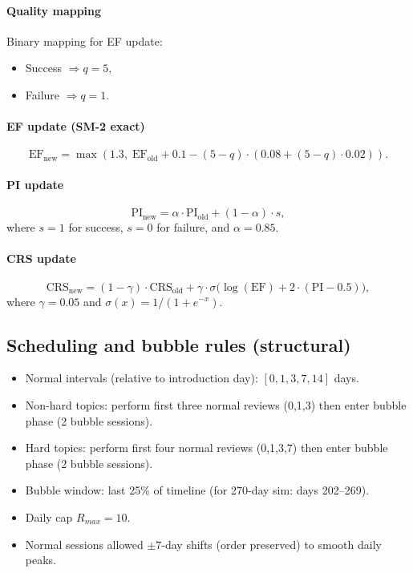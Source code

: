 \documentclass[12pt]{article}
\begin{document}
\paragraph{Quality mapping}
Binary mapping for EF update:
\begin{itemize}
  \item Success $\Rightarrow q = 5$,
  \item Failure $\Rightarrow q = 1$.
\end{itemize}

\paragraph{EF update (SM-2 exact)}
\begin{equation}
\text{EF}_{\text{new}} = \max\left(1.3,\; \text{EF}_{\text{old}} + 0.1 - (5 - q)\cdot\left(0.08 + (5 - q)\cdot 0.02\right)\right).
\end{equation}

\paragraph{PI update}
\begin{equation}
\text{PI}_{\text{new}} = \alpha\cdot\text{PI}_{\text{old}} + (1 - \alpha)\cdot s,
\end{equation}
where $s=1$ for success, $s=0$ for failure, and $\alpha = 0.85$.

\paragraph{CRS update}
\begin{equation}
\text{CRS}_{\text{new}} = (1 - \gamma)\cdot\text{CRS}_{\text{old}} + \gamma\cdot \sigma\big(\log(\text{EF}) + 2\cdot(\text{PI} - 0.5)\big),
\end{equation}
where $\gamma = 0.05$ and $\sigma(x) = 1/(1 + e^{-x})$.

\subsection*{Scheduling and bubble rules (structural)}
\begin{itemize}
  \item Normal intervals (relative to introduction day): $[0,1,3,7,14]$ days.
  \item Non-hard topics: perform first three normal reviews (0,1,3) then enter bubble phase (2 bubble sessions).
  \item Hard topics: perform first four normal reviews (0,1,3,7) then enter bubble phase (2 bubble sessions).
  \item Bubble window: last 25\% of timeline (for 270-day sim: days 202--269).
  \item Daily cap $R_{max}=10$.
  \item Normal sessions allowed $\pm7$-day shifts (order preserved) to smooth daily peaks.
\end{itemize}
\end{document}
